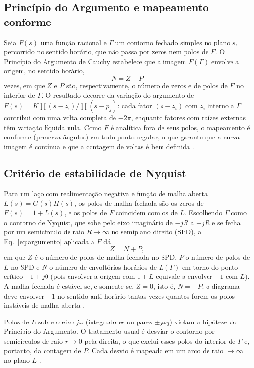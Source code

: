 \documentclass[12pt]{article}
\begin{document}
\subsection{Princípio do Argumento e mapeamento conforme}

Seja $F(s)$ uma função racional e $\Gamma$ um contorno fechado simples no plano $s$, percorrido no sentido horário, que não passa por zeros nem polos de $F$. O Princípio do Argumento de Cauchy estabelece que a imagem $F(\Gamma)$ envolve a origem, no sentido horário,
\begin{equation}
  N = Z - P
  \label{eq:argumento}
\end{equation}
vezes, em que $Z$ e $P$ são, respectivamente, o número de zeros e de polos de $F$ no interior de $\Gamma$. O resultado decorre da variação do argumento de $F(s)=K\prod(s-z_i)/\prod(s-p_j)$: cada fator $(s-z_i)$ com $z_i$ interno a $\Gamma$ contribui com uma volta completa de $-2\pi$, enquanto fatores com raízes externas têm variação líquida nula. Como $F$ é analítica fora de seus polos, o mapeamento é conforme (preserva ângulos) em todo ponto regular, o que garante que a curva imagem é contínua e que a contagem de voltas é bem definida \cite{astrom2008}.

\subsection{Critério de estabilidade de Nyquist}

Para um laço com realimentação negativa e função de malha aberta $L(s)=G(s)H(s)$, os polos de malha fechada são os zeros de $F(s)=1+L(s)$, e os polos de $F$ coincidem com os de $L$. Escolhendo $\Gamma$ como o contorno de Nyquist, que sobe pelo eixo imaginário de $-jR$ a $+jR$ e se fecha por um semicírculo de raio $R\to\infty$ no semiplano direito (SPD), a Eq.~\eqref{eq:argumento} aplicada a $F$ dá
\begin{equation}
  Z = N + P,
  \label{eq:nyquist}
\end{equation}
em que $Z$ é o número de polos de malha fechada no SPD, $P$ o número de polos de $L$ no SPD e $N$ o número de envoltórios horários de $L(\Gamma)$ em torno do ponto crítico $-1+j0$ (pois envolver a origem com $1+L$ equivale a envolver $-1$ com $L$). A malha fechada é estável se, e somente se, $Z=0$, isto é, $N=-P$: o diagrama deve envolver $-1$ no sentido anti-horário tantas vezes quantos forem os polos instáveis de malha aberta \cite{nyquist1932,ogata2010}.

Polos de $L$ sobre o eixo $j\omega$ (integradores ou pares $\pm j\omega_0$) violam a hipótese do Princípio do Argumento. O tratamento usual é desviar o contorno por semicírculos de raio $r\to 0$ pela direita, o que exclui esses polos do interior de $\Gamma$ e, portanto, da contagem de $P$. Cada desvio é mapeado em um arco de raio $\to\infty$ no plano $L$ \cite{astrom2008}.
\end{document}
